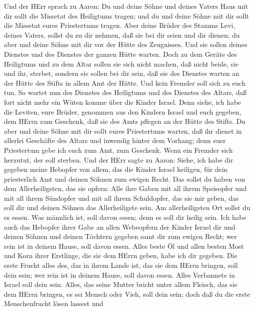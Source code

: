  Und der HErr sprach zu Aaron: Du und deine Söhne und deines
Vaters Haus mit dir sollt die Missetat des Heiligtums tragen; und du und
deine Söhne mit dir sollt die Missetat eures Priestertums tragen.
 Aber deine Brüder des Stamms Levi, deines Vaters, sollst du
zu dir nehmen, daß sie bei dir seien und dir dienen; du aber und deine
Söhne mit dir vor der Hütte des Zeugnisses.  Und sie sollen
deines Dienstes und des Dienstes der ganzen Hütte warten. Doch zu dem
Geräte des Heiligtums und zu dem Altar sollen sie sich nicht machen, daß
nicht beide, sie und ihr, sterbet,  sondern sie sollen bei
dir sein, daß sie des Dienstes warten an der Hütte des Stifts in allem
Amt der Hütte. Und kein Fremder soll sich zu euch tun.  So
wartet nun des Dienstes des Heiligtums und des Dienstes des Altars, daß
fort nicht mehr ein Wüten komme über die Kinder Israel. 
Denn siehe, ich habe die Leviten, eure Brüder, genommen aus den Kindern
Israel und euch gegeben, dem HErrn zum Geschenk, daß sie des Amts
pflegen an der Hütte des Stifts.  Du aber und deine Söhne
mit dir sollt eures Priestertums warten, daß ihr dienet in allerlei
Geschäfte des Altars und inwendig hinter dem Vorhang; denn euer
Priestertum gebe ich euch zum Amt, zum Geschenk. Wenn ein Fremder sich
herzutut, der soll sterben.  Und der HErr sagte zu Aaron:
Siehe, ich habe dir gegeben meine Hebopfer von allem, das die Kinder
Israel heiligen, für dein priesterlich Amt und deinen Söhnen zum ewigen
Recht.  Das sollst du haben von dem Allerheiligsten, das sie
opfern: Alle ihre Gaben mit all ihrem Speisopfer und mit all ihrem
Sündopfer und mit all ihrem Schuldopfer, das sie mir geben, das soll dir
und deinen Söhnen das Allerheiligste sein.  Am
allerheiligsten Ort sollst du es essen. Was männlich ist, soll davon
essen; denn es soll dir heilig sein.  Ich habe auch das
Hebopfer ihrer Gabe an allen Webeopfern der Kinder Israel dir und deinen
Söhnen und deinen Töchtern gegeben samt dir zum ewigen Recht; wer rein
ist in deinem Hause, soll davon essen.  Alles beste Öl und
allen besten Most und Korn ihrer Erstlinge, die sie dem HErrn geben,
habe ich dir gegeben.  Die erste Frucht alles des, das in
ihrem Lande ist, das sie dem HErrn bringen, soll dein sein; wer rein ist
in deinem Hause, soll davon essen.  Alles Verbannete in
Israel soll dein sein.  Alles, das seine Mutter bricht
unter allem Fleisch, das sie dem HErrn bringen, es sei Mensch oder Vieh,
soll dein sein; doch daß du die erste Menschenfrucht lösen lassest und

